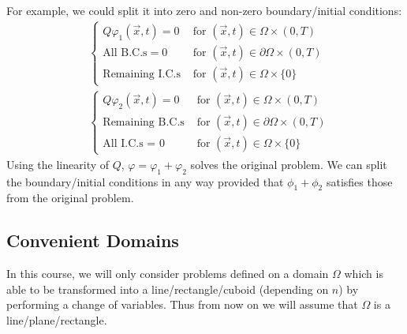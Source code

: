 \documentclass[../main.tex]{subfiles}
\begin{document}
For example, we could split it into zero and non-zero boundary/initial conditions:
\begin{align*}
  &\begin{cases}
  Q \varphi_1(\vec{x}, t) = 0 & \text{ for } (\vec{x}, t) \in \Omega \times (0, T) \\
  \text{All B.C.s} = 0 & \text{ for } (\vec{x}, t) \in \partial \Omega \times (0, T) \\
  \text{Remaining I.C.s} & \text{ for } (\vec{x}, t) \in \Omega \times \{0\}
  \end{cases} \\
  &\begin{cases}
  Q \varphi_2(\vec{x}, t) = 0 & \text{ for } (\vec{x}, t) \in \Omega \times (0, T) \\
  \text{Remaining B.C.s} & \text{ for } (\vec{x}, t) \in \partial \Omega \times (0, T) \\
  \text{All I.C.s = 0} & \text{ for } (\vec{x}, t) \in \Omega \times \{0\}
  \end{cases}
\end{align*}
Using the linearity of $Q$, $\varphi = \varphi_1 + \varphi_2$ solves the original problem.
We can split the boundary/initial conditions in any way provided that $\phi_1 + \phi_2$ satisfies those from the original problem.
\subsection{Convenient Domains}
In this course, we will only consider problems defined on a domain $\Omega$ which is able to be transformed into a line/rectangle/cuboid (depending on $n$) by performing a change of variables.
Thus from now on we will assume that $\Omega$ is a line/plane/rectangle.
\end{document}
